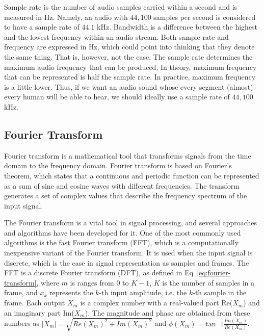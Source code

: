 Sample rate is the number of audio samples carried within a second and is measured in Hz. Namely, an audio with $44,100$ samples per second is considered to have a sample rate of $44.1$ kHz. Bandwidth is a difference between the highest and the lowest frequency within an audio stream. Both sample rate and frequency are expressed in Hz, which could point into thinking that they denote the same thing. That is, however, not the case. The sample rate determines the maximum audio frequency that can be produced. In theory, maximum frequency that can be represented is half the sample rate. In practice, maximum frequency is a little lower. Thus, if we want an audio sound whose every segment (almost) every human will be able to hear, we should ideally use a sample rate of $44,100$ kHz. 

\subsection{Fourier Transform}
\label{sec:fourier-transform}
Fourier transform is a mathematical tool that transforms signals from the time domain to the frequency domain. Fourier transform is based on Fourier's theorem, which states that a continuous and periodic function can be represented as a sum of sine and cosine waves with different frequencies. The transform generates a set of complex values that describe the frequency spectrum of the input signal.

The Fourier transform is a vital tool in signal processing, and several approaches and algorithms have been developed for it. One of the most commonly used algorithms is the fast Fourier transform (FFT), which is a computationally inexpensive variant of the Fourier transform. It is used when the input signal is discrete, which is the case in signal representation as samples and frames. The FFT is a discrete Fourier transform (DFT), as defined in Eq~\ref{eq:fourier-transform}, where $m$ is ranges from $0$ to $K - 1$, $K$ is the number of samples in a frame, and $x_k$ represents the $k$-th input amplitude, i.e. the $k$-th sample in the frame. Each output $X_m$ is a complex number with a real-valued part Re($X_m$) and an imaginary part Im($X_m$). The magnitude and phase are obtained from these numbers as $|X_m| = \sqrt{Re(X_m)^2 + Im(X_m)^2}$ and $\phi(X_m) = \text{tan}^-1 \frac{Im(X_m)}{Re(X_m)}$.

\FourierTransformEquation

